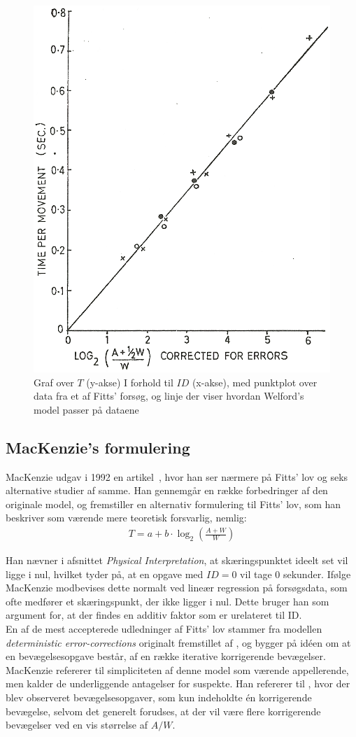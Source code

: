 \begin{figure}[h]
\centering
\includegraphics[width=.5\linewidth]{images/illustrations/welford_plot_2}
\caption{Graf over $T$ (y-akse) I forhold til $ID$ (x-akse), med punktplot over data fra et af Fitts' forsøg, og linje der viser hvordan Welford's model passer på dataene}
\label{fig:WelfordGraf2}
\end{figure}

\subsection*{MacKenzie's formulering}
MacKenzie udgav i 1992 en artikel~\cite{mackenzie1992}, hvor han ser nærmere på Fitts' lov og seks alternative studier af samme. Han gennemgår en række forbedringer af den originale model, og fremstiller en alternativ formulering til Fitts' lov, som han beskriver som værende mere teoretisk forsvarlig, nemlig:
\begin{align}
T=a+b\cdot\log_2\left({\frac{A+W}{W}}\right)
\end{align}

Han nævner i afsnittet \emph{Physical Interpretation}, at skæringspunktet ideelt set vil ligge i nul, hvilket tyder på, at en opgave med $ID=0$ vil tage 0 sekunder. Ifølge MacKenzie modbevises dette normalt ved lineær regression på forsøgsdata, som ofte medfører et skæringspunkt, der ikke ligger i nul. Dette bruger han som argument for, at der findes en additiv faktor som er urelateret til ID.\\

En af de mest accepterede udledninger af Fitts' lov stammer fra modellen \emph{deterministic error-corrections} originalt fremstillet af \cite{crossman1983}, og bygger på idéen om at en bevægelsesopgave består, af en række iterative korrigerende bevægelser. MacKenzie refererer til simpliciteten af denne model som værende appellerende, men kalder de underliggende antagelser for suspekte. Han refererer til \cite{langolf1976}, hvor der blev observeret bevægelsesopgaver, som kun indeholdte én korrigerende bevægelse, selvom det generelt forudses, at der vil være flere korrigerende bevægelser ved en vis størrelse af $A/W$.\\

